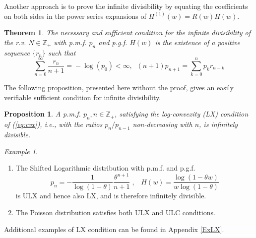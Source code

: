 \documentclass[a4paper,12pt]{amsart}
\newcommand{\Z}{\mathbb{Z}_{+}}
\newtheorem{Theorem}{Theorem}[section]
\newtheorem{Proposition}{Proposition}[section]
\theoremstyle{definition}
\theoremstyle{remark}
\newtheorem{Example}{Example}[section]
\begin{document}
Another approach is to prove the infinite divisibility by equating the coefficients on both sides in the power series expansions of $H^{(1)}(w)=R(w)H(w)$. 

 \begin{Theorem}{\rm \cite{StvH2004}} \label{infd_suf}
The necessary and sufficient condition for the infinite divisibility of the r.v.  $N\in \Z $  with p.m.f. $p_n$  and p.g.f. $H(w)$ is the existence of a positive sequence $\{r_n\}$ such that
\begin{equation}\label{r_k}
\sum_{n=0}^{\infty}\frac{r_n}{n\!+\!1}\!=\!-\log(p_0) < \infty,\;\;  (n\!+\!1)p_{n+1}\! =\!\sum_{k=0}^{n}p_k r_{n-k} 
\end{equation}
\end{Theorem}

The following proposition, presented here without the proof, gives an easily verifiable sufficient condition for infinite divisibility. 

\begin{Proposition} {\rm \cite{StvH2004}}\label{LXpmf}
A p.m.f. $p_n, n\in\mathbb{Z}_+$, satisfying the log-convexity (LX) condition of (\ref{eq:cvx}), i.e., with the ratios
$p_n/p_{n-1}$ non-decreasing with $n$,  is infinitely divisible.    
\end{Proposition}


\begin{Example}\label{ULXCex}
~~~~~
\begin{enumerate}[label=(\roman*), leftmargin=*]
 \item The Shifted Logarithmic distribution with p.m.f. and p.g.f. 
    \begin{equation}\label{shlog}
 p_n =-\frac{1}{\log(1-\theta)}\frac{\theta^{n+1}}{n+1}\;,\;\; \; H(w)=\frac{\log (1-\theta  w)}{w \log (1-\theta )}
\end{equation}
is ULX and hence also LX, and is therefore infinitely divisible. 
\item The Poisson distribution satisfies both ULX and ULC conditions. 
\end{enumerate} 
\end{Example}
Additional examples of LX condition can be found in Appendix \ref{ExLX}.


\end{document}
